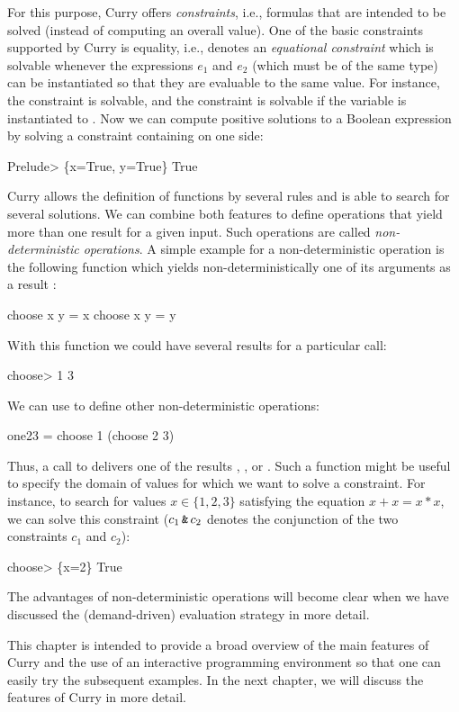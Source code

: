 For this purpose, Curry offers \emph{constraints},
i.e., formulas that are intended to be solved (instead of computing
an overall value). One of the basic constraints supported by Curry
is equality, i.e.,  denotes an
\emph{equational constraint}%
which is solvable whenever the expressions $e_1$ and $e_2$
(which must be of the same type) can be instantiated so that
they are evaluable to the same value. For instance,
the constraint  is solvable, and
the constraint  is solvable if the variable 
is instantiated to . Now we can compute positive solutions
to a Boolean expression by solving a constraint containing 
on one side:
\begin{prog}
Prelude> 
\{x=True, y=True\} True
\end{prog}
%
Curry allows the definition of functions by several rules
and is able to search for several solutions. We can combine
both features to define operations that yield more than one
result for a given input. Such operations are called
\emph{non-deterministic operations}.%
A simple example for a non-deterministic operation
is the following function  which yields
non-deterministically one of its arguments as a result
:
\begin{curry}
choose x y = x
choose x y = y
\end{curry}
With this function we could have several results for a particular call:
\begin{prog}
choose> 
1
3
\end{prog}
We can use  to define other non-deterministic operations:
\begin{curry}
one23 = choose 1 (choose 2 3)
\end{curry}
Thus, a call to  delivers one of the results ,
, or . Such a function might be useful
to specify the domain of values for which we want to solve a
constraint. For instance, to search for values $x \in \{1,2,3\}$
satisfying the equation $x+x = x*x$, we can solve
this constraint ($c_1\,\code{\&}\,c_2$ denotes the conjunction
of the two constraints $c_1$ and $c_2$):
\begin{prog}
choose> 
\{x=2\} True
\end{prog}
The advantages of non-deterministic operations will become clear
when we have discussed the (demand-driven) evaluation strategy
in more detail.

This chapter is intended to provide a broad overview
of the main features of Curry and the use of an interactive
programming environment so that one can easily try the subsequent
examples. In the next chapter, we will discuss the features
of Curry in more detail.



